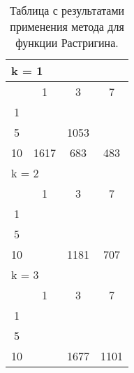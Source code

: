 \begin{table}
  \centering
  \begin{tabular}{|*4{c|}}
  \hline
  \multicolumn{4}{|l|}{k = 1} \\
  \hline
  \diagbox{$\mu$}{$\lambda$} & \multicolumn{1}{c|}{1} & \multicolumn{1}{c|}{3} & \multicolumn{1}{c|}{7} \\
  \hline
  1& \cellcolor{olive}{5124} & \cellcolor{olive}{2301} & \cellcolor{olive}{1411} \\
  \hline
  5& \cellcolor{olive}{1859} & 1053 & \cellcolor{olive}{401} \\
  \hline
  10 & 1617 & 683 & 483 \\
  \hline
  \multicolumn{4}{|l|}{k = 2} \\
  \hline
  \diagbox{$\mu$}{$\lambda$} & \multicolumn{1}{c|}{1} & \multicolumn{1}{c|}{3} & \multicolumn{1}{c|}{7} \\
  \hline
  1& \cellcolor{olive}{5165} & \cellcolor{olive}{3461} & \cellcolor{olive}{1753} \\
  \hline
  5& \cellcolor{olive}{1990} & \cellcolor{olive}{1396} & \cellcolor{olive}{934} \\
  \hline
  10& \cellcolor{olive}{2022} & 1181 & 707 \\
  \hline
  \multicolumn{4}{|l|}{k = 3} \\
  \hline
  \diagbox{$\mu$}{$\lambda$} & \multicolumn{1}{c|}{1} & \multicolumn{1}{c|}{3} & \multicolumn{1}{c|}{7} \\
  \hline
  1& \cellcolor{olive}{6535}& \cellcolor{olive}{3391}& \cellcolor{olive}{2573} \\
  \hline
  5& \cellcolor{olive}{3148}& \cellcolor{olive}{1721}& \cellcolor{olive}{1231} \\
  \hline
  10& \cellcolor{olive}{2352} & 1677 & 1101 \\
  \hline
  \end{tabular}
  \captionsetup{justification=centering}
  \caption{Таблица с результатами применения метода  для функции Растригина.}
  \label{adaptive_rastrigin_results}
\end{table}

